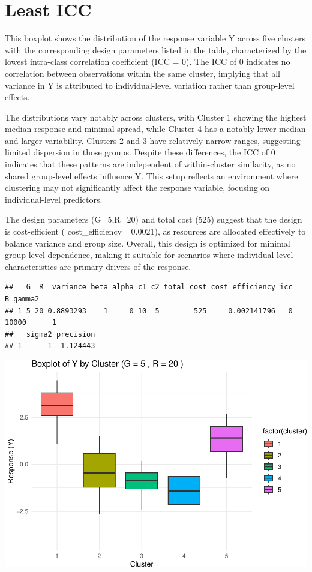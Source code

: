 \documentclass[
]{article}
\begin{document}
\hypertarget{least-icc}{%
\section{Least ICC}\label{least-icc}}

This boxplot shows the distribution of the response variable Y across
five clusters with the corresponding design parameters listed in the
table, characterized by the lowest intra-class correlation coefficient
(ICC = 0). The ICC of 0 indicates no correlation between observations
within the same cluster, implying that all variance in Y is attributed
to individual-level variation rather than group-level effects.

The distributions vary notably across clusters, with Cluster 1 showing
the highest median response and minimal spread, while Cluster 4 has a
notably lower median and larger variability. Clusters 2 and 3 have
relatively narrow ranges, suggesting limited dispersion in those groups.
Despite these differences, the ICC of 0 indicates that these patterns
are independent of within-cluster similarity, as no shared group-level
effects influence Y. This setup reflects an environment where clustering
may not significantly affect the response variable, focusing on
individual-level predictors.

The design parameters (G=5,R=20) and total cost (525) suggest that the
design is cost-efficient ( cost\_efficiency =0.0021), as resources are
allocated effectively to balance variance and group size. Overall, this
design is optimized for minimal group-level dependence, making it
suitable for scenarios where individual-level characteristics are
primary drivers of the response.

\begin{verbatim}
##   G  R  variance beta alpha c1 c2 total_cost cost_efficiency icc     B gamma2
## 1 5 20 0.8893293    1     0 10  5        525     0.002141796   0 10000      1
##   sigma2 precision
## 1      1  1.124443
\end{verbatim}

\begin{center}\includegraphics{Project3Simulation_files/figure-latex/unnamed-chunk-9-1} \end{center}
\end{document}
